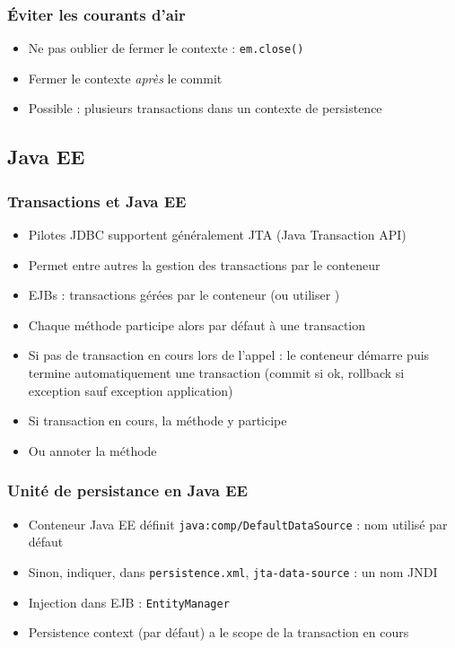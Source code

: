 \documentclass[english, french]{beamer}
\begin{document}
\begin{frame}
	\frametitle{Éviter les courants d’air}
	\begin{itemize}
		\item Ne pas oublier de fermer le contexte : \texttt{em.close()}
		\item Fermer le contexte \emph{après} le commit
		\item Possible : plusieurs transactions dans un contexte de persistence
	\end{itemize}
\end{frame}

\subsection{Java EE}
\begin{frame}
	\frametitle{Transactions et Java EE}
	\begin{itemize}
		\item Pilotes JDBC supportent {\tiny généralement} JTA (Java Transaction API)
		\item Permet {\tiny entre autres} la gestion des transactions par le conteneur
		\item EJBs : transactions gérées par le conteneur {\tiny (ou utiliser )}
		\item Chaque méthode participe alors par défaut à une transaction
		\item Si pas de transaction en cours lors de l’appel : le conteneur démarre puis termine automatiquement une transaction (commit si ok, rollback si exception {\tiny sauf exception application})
		\item Si transaction en cours, la méthode y participe
		\item Ou annoter la méthode 
	\end{itemize}
\end{frame}

\begin{frame}
	\frametitle{Unité de persistance en Java EE}
	\begin{itemize}
		\item Conteneur Java EE définit \texttt{java:comp/DefaultDataSource} : nom utilisé par défaut
		\item Sinon, indiquer, dans \texttt{persistence.xml}, \texttt{jta-data-source} : un nom JNDI
		\item Injection dans EJB :  \texttt{EntityManager}
		\item Persistence context (par défaut) a le scope de la transaction en cours
	\end{itemize}
\end{frame}
\end{document}
